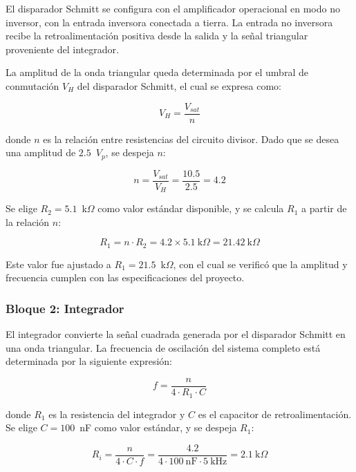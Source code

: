 \documentclass[journal, onecolumn]{IEEEtran}
\begin{document}
El disparador Schmitt se configura con el amplificador operacional en modo no 
inversor, con la entrada inversora conectada a tierra. La entrada no inversora recibe 
la retroalimentación positiva desde la salida y la señal triangular 
proveniente del integrador.

La amplitud de la onda triangular queda determinada por el umbral de conmutación 
$V_H$ del disparador Schmitt, el cual se expresa como:

\begin{equation}
    V_H = \frac{V_{sat}}{n}
    \label{eq:schmitt_umbral}
\end{equation}

donde $n$ es la relación entre resistencias del circuito divisor. Dado que se desea 
una amplitud de $2.5$~$V_p$, se despeja $n$:

\begin{equation}
    n = \frac{V_{sat}}{V_H} = \frac{10.5}{2.5} = 4.2
    \label{eq:n_valor}
\end{equation}

Se elige $R_2 = 5.1$~k$\Omega$ como valor estándar disponible, y se calcula $R_1$ 
a partir de la relación $n$:

\begin{equation}
    R_1 = n \cdot R_2 = 4.2 \times 5.1~\text{k}\Omega = 21.42~\text{k}\Omega
    \label{eq:R1_schmitt}
\end{equation}

Este valor fue ajustado 
a $R_1 = 21.5$~k$\Omega$, 
con el cual se verificó que la amplitud y frecuencia cumplen con las 
especificaciones del proyecto.

\subsubsection{Bloque 2: Integrador}

El integrador convierte la señal cuadrada generada por el disparador Schmitt en 
una onda triangular. La frecuencia de oscilación del sistema completo está 
determinada por la siguiente expresión:

\begin{equation}
    f = \frac{n}{4 \cdot R_1 \cdot C}
    \label{eq:frecuencia_triangular}
\end{equation}

donde $R_1$ es la resistencia del integrador y $C$ es el capacitor de 
retroalimentación. Se elige $C = 100$~nF como valor estándar, y se despeja 
$R_1$:

\begin{equation}
    R_i = \frac{n}{4 \cdot C \cdot f} = \frac{4.2}{4 \cdot 100~\text{nF} 
    \cdot 5~\text{kHz}} = 2.1~\text{k}\Omega
    \label{eq:Ri_integrador}
\end{equation}
\end{document}

